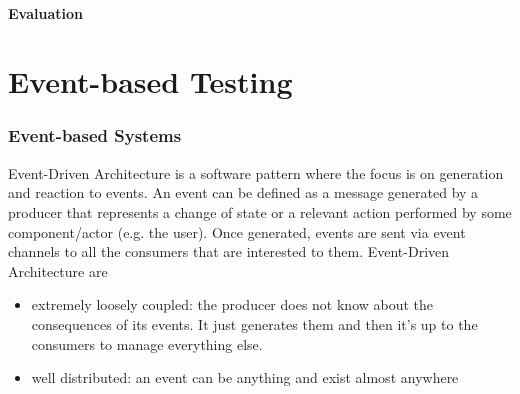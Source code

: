 \documentclass[11pt,a4paper,notitlepage]{article}
\begin{document}
\subsection{Evaluation}



\part{Event-based Testing}

\section{Event-based Systems}
Event-Driven Architecture is a software pattern where the focus is on generation and reaction to events. An event can be defined as a message generated by a producer that represents a change of state or a relevant action performed by some component/actor (e.g. the user). Once generated, events are sent via event channels to all the consumers that are interested to them. Event-Driven Architecture are
\begin{itemize}
	\item extremely loosely coupled: the producer does not know about the consequences of its events. It just generates them and then it's up to the consumers to manage everything else.
	\item well distributed: an event can be anything and exist almost anywhere
\end{itemize}
\end{document}
